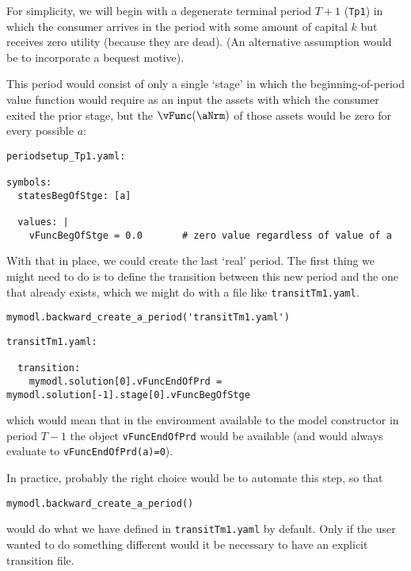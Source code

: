 \documentclass[SolvingMicroDSOPs]{subfiles}
\begin{document}
For simplicity, we will begin with a degenerate terminal period $T+1$ (\texttt{Tp1}) in which the consumer arrives in the period with some amount of capital $k$ but receives zero utility (because they are dead).  (An alternative assumption would be to incorporate a bequest motive).

This period would consist of only a single `stage' in which the beginning-of-period value function would require as an input the assets with which the consumer exited the prior stage, but the $\vFunc(\aNrm)$ of those assets would be zero for every possible $a$:

\begin{verbatim}
periodsetup_Tp1.yaml:

symbols:
  statesBegOfStge: [a]

  values: | 
    vFuncBegOfStge = 0.0       # zero value regardless of value of a
\end{verbatim}

With that in place, we could create the last `real' period.  The first thing we might need to do is to define the transition between this new period and the one that already exists, which we might do with a file like \texttt{transitTm1.yaml}.

\begin{verbatim}
mymodl.backward_create_a_period('transitTm1.yaml')
\end{verbatim}

\begin{verbatim}
transitTm1.yaml:

  transition:
    mymodl.solution[0].vFuncEndOfPrd = mymodl.solution[-1].stage[0].vFuncBegOfStge

\end{verbatim}
which would mean that in the environment available to the model constructor in period $T-1$ the object \texttt{vFuncEndOfPrd} would be available (and would always evaluate to \texttt{vFuncEndOfPrd(a)=0}).

In practice, probably the right choice would be to automate this step, so that
\begin{verbatim}
mymodl.backward_create_a_period()
\end{verbatim}
would do what we have defined in \texttt{transitTm1.yaml} by default.  Only if the user wanted to do something different would it be necessary to have an explicit transition file.
\end{document}
